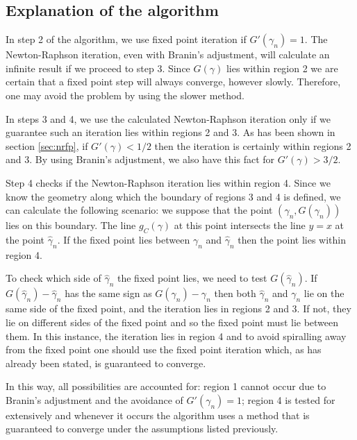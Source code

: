 \documentclass{article}
\begin{document}
\subsection{Explanation of the algorithm}

In step 2 of the algorithm, we use fixed point iteration if $G'(\gamma_n) = 1$.
The Newton-Raphson iteration, even with Branin's adjustment, will calculate an infinite result if we proceed to step 3.
Since $G(\gamma)$ lies within region 2 we are certain that a fixed point step will always converge, however slowly.
Therefore, one may avoid the problem by using the slower method.

In steps 3 and 4, we use the calculated Newton-Raphson iteration only if we guarantee such an iteration lies within regions 2 and 3.
As has been shown in section \ref{sec:nrfp}, if $G'(\gamma) < 1/2$ then the iteration is certainly within regions 2 and 3.
By using Branin's adjustment, we also have this fact for $G'(\gamma) > 3/2$.

Step 4 checks if the Newton-Raphson iteration lies within region 4.
Since we know the geometry along which the boundary of regions 3 and 4 is defined, we can calculate the following scenario:
we suppose that the point $(\gamma_n, G(\gamma_n))$ lies on this boundary.
The line $g_C(\gamma)$ at this point intersects the line $y=x$ at the point $\hat{\gamma}_n$.
If the fixed point lies between $\gamma_n$ and $\hat{\gamma}_n$ then the point lies within region 4.

To check which side of $\hat{\gamma}_n$ the fixed point lies, we need to test $G(\hat{\gamma}_n)$.
If $G(\hat{\gamma}_n) - \hat{\gamma}_n$ has the same sign as $G(\gamma_n) - \gamma_n$ then both $\hat{\gamma}_n$ and $\gamma_n$ lie on the same side of the fixed point, and the iteration lies in regions 2 and 3.
If not, they lie on different sides of the fixed point and so the fixed point must lie between them.
In this instance, the iteration lies in region 4 and to avoid spiralling away from the fixed point one should use the fixed point iteration which, as has already been stated, is guaranteed to converge.

In this way, all possibilities are accounted for: region 1 cannot occur due to Branin's adjustment and the avoidance of $G'(\gamma_n) = 1$; region 4 is tested for extensively and whenever it occurs the algorithm uses a method that is guaranteed to converge under the assumptions listed previously.



\end{document}
